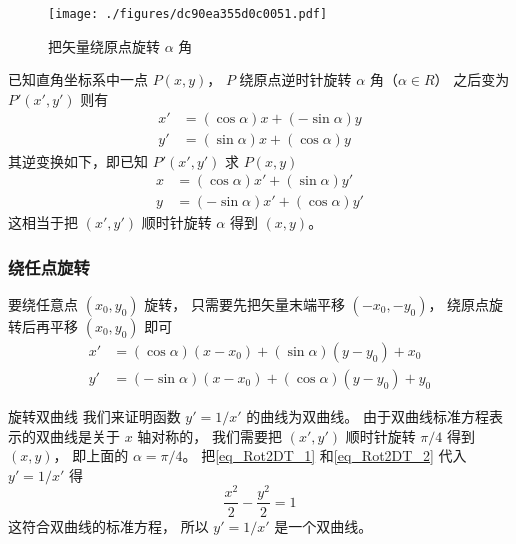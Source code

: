 

\begin{figure}[ht]
\centering
\texttt{[image: ./figures/dc90ea355d0c0051.pdf]}
\caption{把矢量绕原点旋转 $\alpha$ 角} \label{fig_Rot2DT_1}
\end{figure}

已知直角坐标系中一点 $P(x,y)$， $P$ 绕原点逆时针旋转 $\alpha $ 角（$\alpha  \in R$） 之后变为 $P'(x',y')$ 则有
\begin{align}\label{eq_Rot2DT_1}
x' &= (\cos \alpha)x + (- \sin \alpha)y \\
\label{eq_Rot2DT_2}
y' &= (\sin \alpha)x + (\cos \alpha)y
\end{align}
其逆变换如下，即已知 $P'(x',y')$ 求 $P(x,y)$ 
\begin{align}\label{eq_Rot2DT_3}
x &= ( \cos \alpha  )x' + ( \sin \alpha  )y' \\
\label{eq_Rot2DT_4}
y &= ( - \sin \alpha)x' + ( \cos \alpha )y'
\end{align}
这相当于把 $(x', y')$ 顺时针旋转 $\alpha$ 得到 $(x, y)$。

\subsubsection{绕任点旋转}
要绕任意点 $(x_0, y_0)$ 旋转， 只需要先把矢量末端平移 $(-x_0, -y_0)$， 绕原点旋转后再平移 $(x_0, y_0)$ 即可
\begin{equation}\label{eq_Rot2DT_5}
\begin{aligned}
x' &= ( \cos \alpha  )(x-x_0) + ( \sin \alpha  )(y-y_0) + x_0 \\
y' &= ( - \sin \alpha)(x-x_0) + ( \cos \alpha )(y-y_0) + y_0
\end{aligned}
\end{equation}

\begin{example}{旋转双曲线}
我们来证明函数 $y' = 1/x'$ 的曲线为双曲线。 由于双曲线标准方程表示的双曲线是关于 $x$ 轴对称的， 我们需要把 $(x', y')$ 顺时针旋转 $\pi/4$ 得到 $(x, y)$， 即上面的 $\alpha = \pi/4$。 把\autoref{eq_Rot2DT_1} 和\autoref{eq_Rot2DT_2} 代入 $y' = 1/x'$ 得
\begin{equation}
\frac{x^2}{2} - \frac{y^2}{2} = 1
\end{equation}
这符合双曲线的标准方程， 所以 $y' = 1/x'$ 是一个双曲线。
\end{example}

